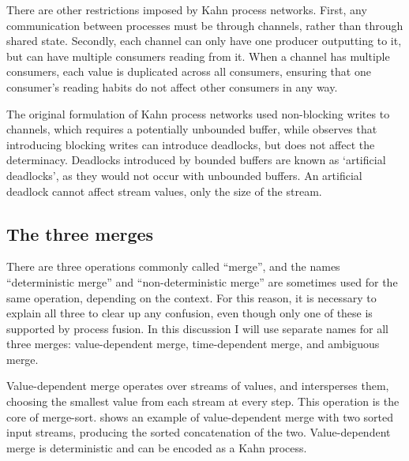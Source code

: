 There are other restrictions imposed by Kahn process networks.
First, any communication between processes must be through channels, rather than through shared state.
Secondly, each channel can only have one producer outputting to it, but can have multiple consumers reading from it.
When a channel has multiple consumers, each value is duplicated across all consumers, ensuring that one consumer's reading habits do not affect other consumers in any way.

The original formulation of Kahn process networks used non-blocking writes to channels, which requires a potentially unbounded buffer, while \citet{parks1995bounded} observes that introducing blocking writes can introduce deadlocks, but does not affect the determinacy.
Deadlocks introduced by bounded buffers are known as `artificial deadlocks', as they would not occur with unbounded buffers.
An artificial deadlock cannot affect stream values, only the size of the stream.

\subsection{The three merges}
There are three operations commonly called ``merge'', and the names ``deterministic merge'' and ``non-deterministic merge'' are sometimes used for the same operation, depending on the context.
For this reason, it is necessary to explain all three to clear up any confusion, even though only one of these is supported by process fusion.
In this discussion I will use separate names for all three merges: value-dependent merge, time-dependent merge, and ambiguous merge.


Value-dependent merge operates over streams of values, and intersperses them, choosing the smallest value from each stream at every step.
This operation is the core of merge-sort.
 shows an example of value-dependent merge with two sorted input streams, producing the sorted concatenation of the two.
Value-dependent merge is deterministic and can be encoded as a Kahn process.


